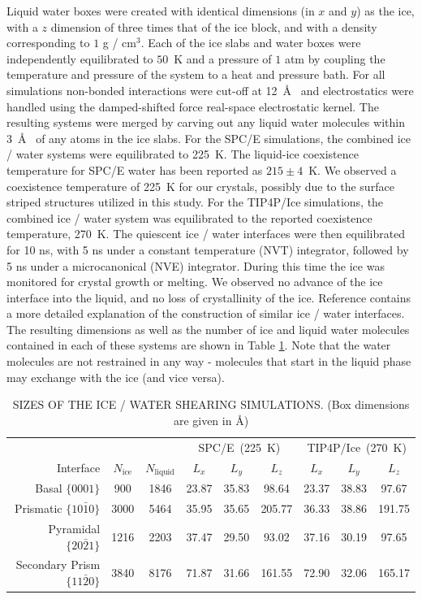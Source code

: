 Liquid water boxes were created with identical dimensions (in $x$ and
$y$) as the ice, with a $z$ dimension of three times that of the ice
block, and with a density corresponding to $1$ g / cm$^3$.  Each of
the ice slabs and water boxes were independently equilibrated to
$50$~K and a pressure of $1$ atm by coupling the temperature and
pressure of the system to a heat and pressure bath. For all
simulations non-bonded interactions were cut-off at 12~\AA~ and
electrostatics were handled using the damped-shifted force real-space
electrostatic kernel.\cite{Fennell2006} The resulting systems were
merged by carving out any liquid water molecules within 3~\AA~ of any
atoms in the ice slabs.  For the SPC/E simulations, the combined ice /
water systems were equilibrated to 225~K. The liquid-ice coexistence
temperature for SPC/E water has been reported as
$215 \pm 4$~K.\cite{Vega2006a,Fernandez2006} We observed a coexistence
temperature of 225~K for our crystals, possibly due to the surface
striped structures utilized in this study. For the TIP4P/Ice
simulations, the combined ice / water system was equilibrated to the
reported coexistence temperature, 270~K.\cite{Vega2006a,Fernandez2006}
The quiescent ice / water interfaces were then equilibrated for 10 ns,
with 5 ns under a constant temperature (NVT) integrator, followed by 5
ns under a microcanonical (NVE) integrator.  During this time the ice
was monitored for crystal growth or melting. We observed no advance of
the ice interface into the liquid, and no loss of crystallinity of the
ice. Reference  contains a more detailed
explanation of the construction of similar ice / water interfaces. The
resulting dimensions as well as the number of ice and liquid water
molecules contained in each of these systems are shown in Table
\ref{tab:sizes}.  Note that the water molecules are not restrained in
any way - molecules that start in the liquid phase may exchange with
the ice (and vice versa).

\begin{table}[h]
\centering
\caption{SIZES OF THE ICE / WATER SHEARING SIMULATIONS. (Box
  dimensions are given in \AA)\label{tab:sizes}}
\begin{tabular}{r|cc|ccc|ccc}
\toprule
 & & & \multicolumn{3}{c|}{SPC/E~(225~K)} &  \multicolumn{3}{c}{TIP4P/Ice~(270~K)}\\
 Interface & $N_\mathrm{ice}$ &
 $N_\mathrm{liquid}$ & $L_x$ & $L_y$ & $L_z$ & $L_x$ & $L_y$ & $L_z$ \\
\midrule
Basal  $\{0001\}$                 & 900 & 1846  & 23.87 & 35.83 & 98.64  & 23.37 & 38.83 & 97.67  \\
Prismatic  $\{10\bar{1}0\}$       & 3000 & 5464 & 35.95 & 35.65 & 205.77 & 36.33 & 38.86 & 191.75 \\
Pyramidal  $\{20\bar{2}1\}$       & 1216 & 2203 & 37.47 & 29.50 & 93.02  & 37.16 & 30.19 & 97.65  \\
Secondary Prism  $\{11\bar{2}0\}$ & 3840 & 8176 & 71.87 & 31.66 & 161.55 & 72.90 & 32.06 & 165.17 \\
\bottomrule
\end{tabular}
\end{table}


